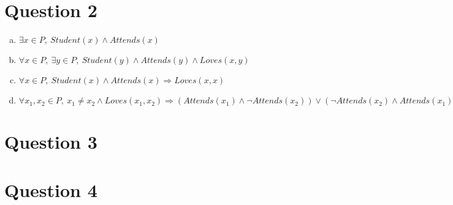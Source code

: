 \documentclass[12pt]{article}
\begin{document}
\section*{Question 2}
\begin{enumerate}[a.]
    \item

    $\exists x \in P,\: Student(x) \land Attends(x)$

    \item

    $\forall x \in P,\:\exists y \in P,\:Student(y) \land Attends(y) \land Loves(x,y)$

    \item

    $\forall x \in P,\: Student(x) \land Attends(x) \Rightarrow Loves(x,x)$

    \item

    $\forall x_1,x_2 \in P,\:x_1 \neq x_2 \land Loves(x_1,x_2) \Rightarrow
    (Attends(x_1) \land \neg Attends(x_2)) \lor (\neg Attends(x_2) \land Attends(x_1))$

\end{enumerate}


\section*{Question 3}

\section*{Question 4}
\end{document}
